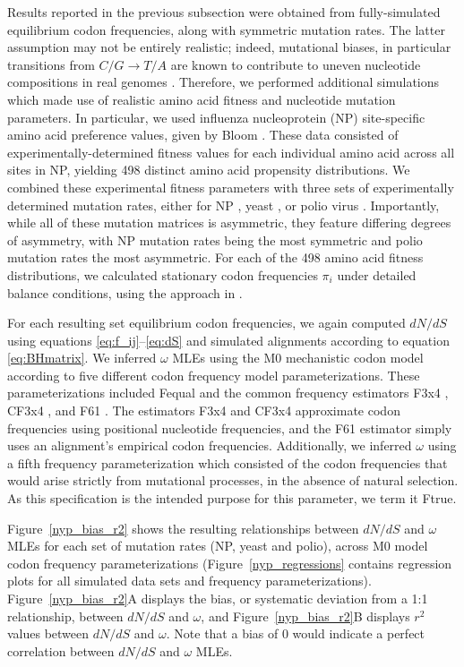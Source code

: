 \documentclass[11pt]{article}
\begin{document}
Results reported in the previous subsection were obtained from fully-simulated equilibrium codon frequencies, along with symmetric mutation rates. The latter assumption may not be entirely realistic; indeed, mutational biases, in particular transitions from $C/G \rightarrow T/A$ are known to contribute to uneven nucleotide compositions in real genomes \cite{Hernandez2007,HershbergPetrov2010,Zhu2014,Acevedo2014}. Therefore, we performed additional simulations which made use of realistic amino acid fitness and nucleotide mutation parameters. In particular, we used influenza nucleoprotein (NP) site-specific amino acid preference values, given by Bloom \cite{Bloom2014a}. These data consisted of experimentally-determined fitness values for each individual amino acid across all sites in NP, yielding 498 distinct amino acid propensity distributions. We combined these experimental fitness parameters with three sets of experimentally determined mutation rates, either for NP \cite{Bloom2014a}, yeast \cite{Zhu2014}, or polio virus \cite{Acevedo2014}. Importantly, while all of these mutation matrices is asymmetric, they feature differing degrees of asymmetry, with NP mutation rates being the most symmetric and polio mutation rates the most asymmetric. For each of the 498 amino acid fitness distributions, we calculated stationary codon frequencies $\pi_i$ under detailed balance conditions, using the approach in \cite{Bloom2014a,Bloom2014b}. 

For each resulting set equilibrium codon frequencies, we again computed $dN/dS$ using equations \eqref{eq:f_ij}--\eqref{eq:dS} and simulated alignments according to equation \eqref{eq:BHmatrix}. We inferred $\omega$ MLEs using the M0 mechanistic codon model  according to five different codon frequency model parameterizations. These parameterizations included Fequal \cite{Yang2006} and the common frequency estimators F3x4 \cite{MuseGaut1994}, CF3x4 \cite{Pond2010}, and F61 \cite{GoldmanYang1994}. The estimators F3x4 and CF3x4 approximate codon frequencies using positional nucleotide frequencies, and the F61 estimator simply uses an alignment's empirical codon frequencies. Additionally, we inferred $\omega$ using a fifth frequency parameterization which consisted of the codon frequencies that would arise strictly from mutational processes, in the absence of natural selection. As this specification is the intended purpose for this parameter, we term it Ftrue.


Figure~\ref{nyp_bias_r2} shows the resulting relationships between $dN/dS$ and $\omega$ MLEs for each set of mutation rates (NP, yeast and polio), across M0 model codon frequency parameterizations (Figure~\ref{nyp_regressions} contains regression plots for all simulated data sets and frequency parameterizations). Figure~\ref{nyp_bias_r2}A displays the bias, or systematic deviation from a 1:1 relationship, between $dN/dS$ and $\omega$, and Figure~\ref{nyp_bias_r2}B displays $r^2$ values between $dN/dS$ and $\omega$. Note that a bias of 0 would indicate a perfect correlation between $dN/dS$ and $\omega$ MLEs.
\end{document}
